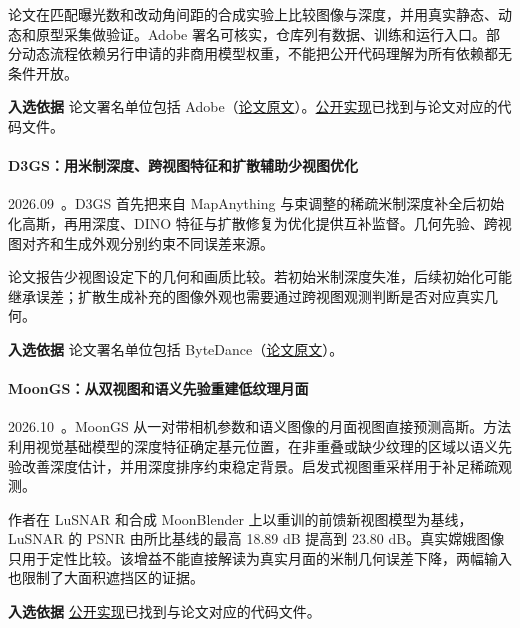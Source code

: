 论文在匹配曝光数和改动角间距的合成实验上比较图像与深度，并用真实静态、动态和原型采集做验证。Adobe 署名可核实，仓库列有数据、训练和运行入口。部分动态流程依赖另行申请的非商用模型权重，不能把公开代码理解为所有依赖都无条件开放。

\textbf{入选依据} 论文署名单位包括 Adobe（\href{https://arxiv.org/html/2608.20602v1}{论文原文}）。\href{https://github.com/shamus-li/lightfield-gaussian-splatting}{公开实现}已找到与论文对应的代码文件。

\paragraph{D3GS：用米制深度、跨视图特征和扩散辅助少视图优化}
2026.09~\cite{2609_22941}。D3GS 首先把来自 MapAnything 与束调整的稀疏米制深度补全后初始化高斯，再用深度、DINO 特征与扩散修复为优化提供互补监督。几何先验、跨视图对齐和生成外观分别约束不同误差来源。

论文报告少视图设定下的几何和画质比较。若初始米制深度失准，后续初始化可能继承误差；扩散生成补充的图像外观也需要通过跨视图观测判断是否对应真实几何。

\textbf{入选依据} 论文署名单位包括 ByteDance（\href{https://arxiv.org/abs/2609.22941}{论文原文}）。

\paragraph{MoonGS：从双视图和语义先验重建低纹理月面}
2026.10~\cite{2610_07110}。MoonGS 从一对带相机参数和语义图像的月面视图直接预测高斯。方法利用视觉基础模型的深度特征确定基元位置，在非重叠或缺少纹理的区域以语义先验改善深度估计，并用深度排序约束稳定背景。启发式视图重采样用于补足稀疏观测。

作者在 LuSNAR 和合成 MoonBlender 上以重训的前馈新视图模型为基线，LuSNAR 的 PSNR 由所比基线的最高 18.89 dB 提高到 23.80 dB。真实嫦娥图像只用于定性比较。该增益不能直接解读为真实月面的米制几何误差下降，两幅输入也限制了大面积遮挡区的证据。

\textbf{入选依据} \href{https://github.com/inrobots/moonblender}{公开实现}已找到与论文对应的代码文件。
